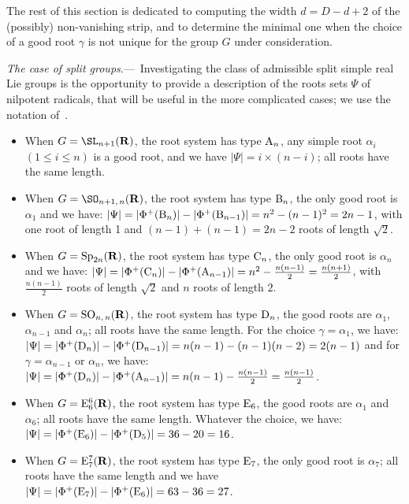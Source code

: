 
The rest of this section is dedicated to computing the width $d = D-d+2$ of the (possibly) non-vanishing strip, and to determine the minimal one when the choice of a good root $\gamma$ is not unique for the group $G$ under consideration.


\emph{The case of split groups}.---~Investigating the class of admissible split simple real Lie groups is the opportunity to provide a description of the roots sets $\Psi$ of nilpotent radicals, that will be useful in the more complicated cases; we use the notation of~\cite[Planches]{BBK-Lie-4to6}.
\begin{itemize}
\item When $G = {\SL}_{n+1}({\bf R})$, the root system has type ${\rm A}_n$, any simple root $\alpha_i$ $(1 \leqslant i \leqslant n)$ is a good root, and we have $|\Psi| = i \times (n-i)$; all roots have the same length.
\item When $G = {\SO}_{n+1,\,n}({\bf R})$, the root system has type ${\rm B}_n$, the only good root is $\alpha_1$ and we have: $|\Psi| = |\Phi^+({\rm B}_n)|-|\Phi^+({\rm B}_{n-1})|=n^2 -(n-1)^2=2n-1$, with one root of length 1 and $(n-1)+(n-1)=2n-2$ roots of length $\sqrt{2}$.
\item When $G = {\rm Sp}_{2n}({\bf R})$, the root system has type ${\rm C}_n$, the only good root is $\alpha_n$ and we have: $|\Psi| = |\Phi^+({\rm C}_n)|-|\Phi^+({\rm A}_{n-1})|=n^2 -\frac{n(n-1)}{2}=\frac{n(n+1)}{2}$, with $\frac{n(n-1)}{2}$ roots of length $\sqrt{2}$ and $n$ roots of length $2$.
\item When $G = {\rm SO}_{n,\,n}({\bf R})$, the root system has type ${\rm D}_n$, the good roots are $\alpha_1$, $\alpha_{n-1}$ and $\alpha_n$; all roots have the same length. For the choice $\gamma=\alpha_1$, we have: $|\Psi| = |\Phi^+({\rm D}_n)|-|\Phi^+({\rm D}_{n-1})|=n(n-1)-(n-1)(n-2)=2(n-1)$ and for $\gamma=\alpha_{n-1}$ or $\alpha_n$, we have: $|\Psi| = |\Phi^+({\rm D}_n)|-|\Phi^+({\rm A}_{n-1})| = n(n-1) - \frac{n(n-1)}{2}\linebreak= \frac{n(n-1)}{2}$.
\item When $G = {\rm E}_6^6({\bf R})$, the root system has type ${\rm E}_6$, the good roots are $\alpha_1$ and $\alpha_6$; all roots have the same length. Whatever the choice, we have:\linebreak$|\Psi| = |\Phi^+({\rm E}_6)|-|\Phi^+({\rm D}_5)| = 36-20 = 16$.
\item When $G = {\rm E}_7^7({\bf R})$, the root system has type ${\rm E}_7$, the only good root is $\alpha_7$; all roots have the same length and we have $|\Psi| = |\Phi^+({\rm E}_7)|-|\Phi^+({\rm E}_6)|\linebreak= 63-36= 27$.
\end{itemize}

